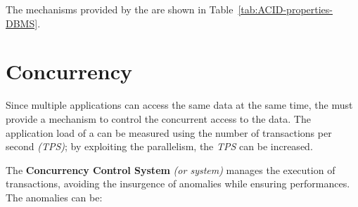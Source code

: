 \documentclass[english]{article}
\begin{document}
The mechanisms provided by the \dbms are shown in Table~\ref{tab:ACID-properties-DBMS}.

\begin{table}[htbp]
  \bigskip
  \centering
  \bigskip
  \caption{ACID properties and the \dbms mechanisms}
  \label{tab:ACID-properties-DBMS}
\end{table}

\clearpage

\section{Concurrency}

Since multiple applications can access the same data at the same time, the \dbms must provide a mechanism to control the concurrent access to the data.
The application load of a \dbms can be measured using the number of transactions per second \textit{(TPS)};
by exploiting the parallelism, the \textit{TPS} can be increased.

The \textbf{Concurrency Control System} \textit{(or \CC system)} manages the execution of transactions, avoiding the insurgence of anomalies while ensuring performances.
The anomalies can be:
\end{document}
